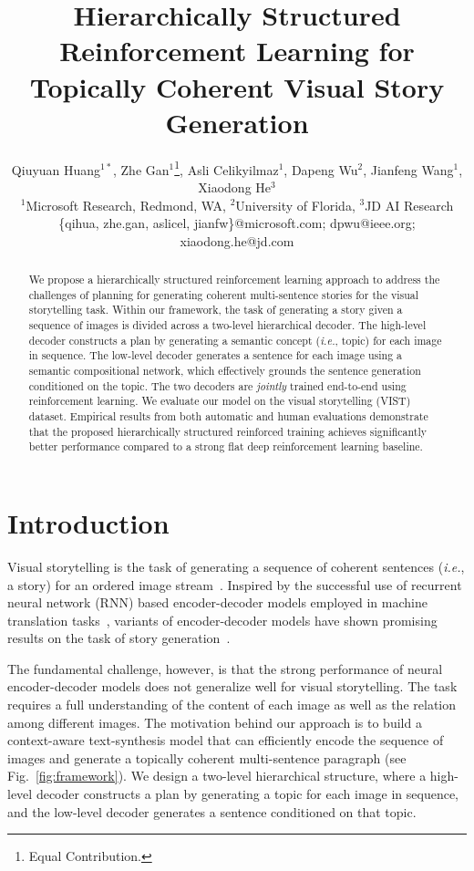 \documentclass[letterpaper]{article} \usepackage{aaai19}  \usepackage{times}  \usepackage{helvet}  \usepackage{courier}  \usepackage{url}  \usepackage{graphicx}
\begin{document}
\title{Hierarchically Structured Reinforcement Learning for Topically Coherent Visual Story Generation}
\author{Qiuyuan Huang$^{1*}$, Zhe Gan$^{1}$\thanks{Equal Contribution.}, Asli Celikyilmaz$^1$, Dapeng Wu$^2$, Jianfeng Wang$^1$, Xiaodong He$^3$\\
$^1$Microsoft Research, Redmond, WA, $^2$University of Florida, $^3$JD AI Research\\
\{qihua, zhe.gan, aslicel, jianfw\}@microsoft.com; dpwu@ieee.org; xiaodong.he@jd.com
}
\maketitle
\begin{abstract}
We propose a hierarchically structured reinforcement learning approach to address the challenges of planning for generating coherent multi-sentence stories for the visual storytelling task. Within our framework, the task of generating a story given a sequence of images is divided across a two-level hierarchical decoder. The high-level decoder constructs a plan by generating a semantic concept (\emph{i.e.}, topic) for each image in sequence. The low-level decoder generates a sentence for each image using a semantic compositional network, which effectively grounds the sentence generation conditioned on the topic. The two decoders are \textit{jointly} trained end-to-end using reinforcement learning. We evaluate our model on the visual storytelling (VIST) dataset. Empirical results from both automatic and human evaluations demonstrate that the proposed hierarchically structured reinforced training achieves significantly better performance compared to a strong flat deep reinforcement learning baseline.
\end{abstract}

\section{Introduction} \label{sec:Introduction}
Visual storytelling is the task of generating a sequence of coherent sentences (\emph{i.e.}, a story) for an ordered image stream~\cite{park2015expressing,huang2016visual,liu2017let}. Inspired by the successful use of recurrent neural network (RNN) based encoder-decoder models employed in machine translation tasks~\cite{cho2014learning,sutskever2014sequence}, variants of encoder-decoder models have shown promising results on the task of story generation~\cite{huang2016visual}.

The fundamental challenge, however, is that the strong performance of neural encoder-decoder models does not generalize well for visual storytelling.  
The task requires a full understanding of the content of each image as well as the relation among different images.
The motivation behind our approach is to build a context-aware text-synthesis model that can efficiently encode the sequence of images and generate a topically coherent multi-sentence paragraph (see Fig.~\ref{fig:framework}). We design a two-level hierarchical structure, where a high-level decoder 
constructs a plan by generating a topic for each image in sequence, and the low-level decoder generates a sentence conditioned on that topic. 
\end{document}
